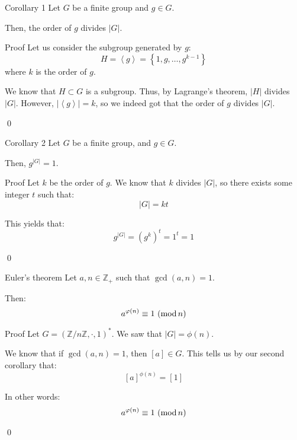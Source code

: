 \documentclass[a4paper]{article}
\begin{document}
\begin{parag}{Corollary 1}
    Let $G$ be a finite group and $g \in G$.

    Then, the order of $g$ divides $\left|G\right|$.

    \begin{subparag}{Proof}
        Let us consider the subgroup generated by $g$: 
        \[H = \left\langle g \right\rangle = \left\{1, g, \ldots, g^{k-1}\right\}\]
        where $k$ is the order of $g$.

        We know that $H \subset G$ is a subgroup. Thus, by Lagrange's theorem, $\left|H\right|$ divides $\left|G\right|$. However, $\left|\left\langle g \right\rangle\right| = k$, so we indeed got that the order of $g$ divides $\left|G\right|$.

        \qed
    \end{subparag}
    
\end{parag}

\begin{parag}{Corollary 2}
    Let $G$ be a finite group, and $g \in G$.

    Then, $g^{\left|G\right|} = 1$.

    \begin{subparag}{Proof}
        Let $k$ be the order of $g$. We know that $k$ divides $\left|G\right|$, so there exists some integer $t$ such that: 
        \[\left|G\right| = kt\]

        This yields that: 
        \[g^{\left|G\right|} = \left(g^k\right)^t = 1^t = 1\]

        \qed
    \end{subparag}
\end{parag}

\begin{parag}{Euler's theorem}
    Let $a, n \in \mathbb{Z}_+$ such that $\gcd\left(a, n\right) = 1$.

    Then: 
    \[\congruent{a^{\phi\left(n\right)}}{1}{n}\]
    
    \begin{subparag}{Proof}
        Let $G = \left(\mathbb{Z}/n\mathbb{Z}, \cdot, 1\right)^*$. We saw that $\left|G\right| = \phi\left(n\right)$.

        We know that if $\gcd\left(a, n\right) = 1$, then $\left[a\right] \in G$. This tells us by our second corollary that: 
        \[\left[a\right]^{\phi\left(n\right)} = \left[1\right]\]
        
        In other words:
        \[\congruent{a^{\phi\left(n\right)}}{1}{n}\]

        \qed
    \end{subparag}
\end{parag}
\end{document}
